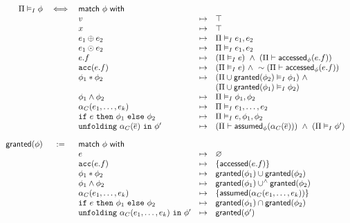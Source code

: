 \begin{align*}
\begin{array}{rclcl}
\Pi \frames \phi &\iff& \tsf{match} \ \phi \ \tsf{with} &&
\\
&& v &\mt&
  \top
\\
&& x &\mt&
  \top
\\
&& e_1 \oplus e_2 &\mt&
  \Pi \frames e_1, e_2
\\
&& e_1 \odot e_2 &\mt&
  \Pi \frames e_1, e_2
\\
&& e.f &\mt&
  (\Pi \frames e) \ \land \ (\Pi \entails \accessed_\phi(e.f))
\\
&& \cacc(e.f) &\mt&
  (\Pi \frames e)  \ \land \
  \pnot (\Pi \entails \accessed_\phi(e.f))
\\
&& \phi_1 \ast \phi_2 &\mt&
  (\Pi \cup \granted(\phi_2) \frames \phi_1) \ \land \\ &&&&
  (\Pi \cup \granted(\phi_1) \frames \phi_2)
\\
&& \phi_1 \land \phi_2 &\mt&
  \Pi \frames \phi_1, \phi_2
\\
&& \alpha_C(e_1, \dots, e_k) &\mt&
  \Pi \frames e_1, \dots, e_2
\\
&& \cif \ e \ \cthen \ \phi_1 \ \celse \ \phi_2 &\mt&
  \Pi \frames e, \phi_1, \phi_2
\\
&& \cunfolding \ \alpha_C(\vec{e}) \ \cin \ \phi\p &\mt&
  (\Pi \entails \assumed_\phi(\alpha_C(\vec{e}))) \ \land \
  (\Pi \frames \phi\p)
%
\\[1em]
%
\granted(\phi) &:=& \tsf{match} \ \phi \ \tsf{with} &&
\\
&& e &\mt&
  \empty
\\
&& \cacc(e.f) &\mt&
  \set{ \accessed(e.f) }
\\
&& \phi_1 \ast \phi_2 &\mt&
  \granted(\phi_1) \cup \granted(\phi_2)
\\
&& \phi_1 \land \phi_2 &\mt&
  \granted(\phi_1) \cup^\land \granted(\phi_2)
\\
&& \alpha_C(e_1, \dots, e_k) &\mt&
  \set{ \assumed(\alpha_C(e_1, \dots, e_k)) }
\\
&& \cif \ e \ \cthen \ \phi_1 \ \celse \ \phi_2 &\mt&
  \granted(\phi_1) \cap \granted(\phi_2)
\\
&& \cunfolding \ \alpha_C(e_1, \dots, e_k) \ \cin \ \phi\p &\mt&
  \granted(\phi\p)
\end{array}
\end{align*}

